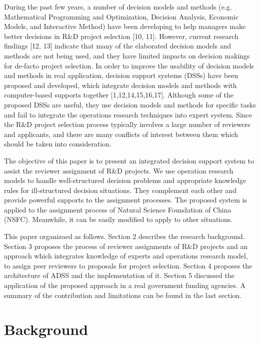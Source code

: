 \documentclass{elsarticle}
\begin{document}
During the past few years, a number of decision models and methods
(e.g. Mathematical Programming and Optimization, Decision Analysis,
Economic Models, and Interactive Method) have been developing to help
managers make better decisions in R\&D project selection [10,
11]. However, current research findings [12, 13] indicate that many of
the elaborated decision models and methods are not being used, and
they have limited impacts on decision makings for de-facto project
selection. In order to improve the usability of decision models and
methods in real application, decision support systems (DSSs) have been
proposed and developed, which integrate decision models and methods
with computer-based supports together [1,12,14,15,16,17]. Although
some of the proposed DSSs are useful, they use decision models and
methods for specific tasks and fail to integrate the operations
research techniques into expert system. Since the R\&D project
selection process typically involves a large number of reviewers and
applicants, and there are many conflicts of interest between them
which should be taken into consideration. 

The objective of this paper is to present an integrated decision
support system to assist the reviewer assignment of R\&D projects. We
use operation research models to handle well-structured decision
problems and appropriate knowledge rules for ill-structured decision
situations. They complement each other and provide powerful supports
to the assignment processes. The proposed system is applied to the
assignment process of Natural Science Foundation of China (NSFC). Meanwhile, it can be easily modified to apply to other situations.

This paper organizaed as follows. Section 2 describes the research
background. Section 3 proposes the process of reviewer assignments of
R\&D projects and an approach which integrates knowledge of experts
and operations research model, to assign peer reviewers to proposals
for project selection. Section 4 proposes the architecture of ADSS and
the implementation of it. Section 5 discussed the application of the proposed approach in a real government funding agencies. A summary of the contribution and limitations can be found in the last section.

\section{Background}
\label{sec:background}
\end{document}
